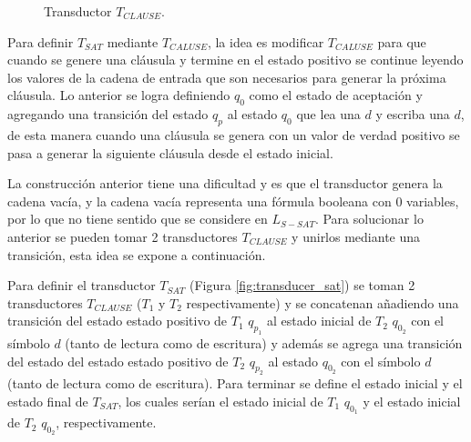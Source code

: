\documentclass[12pt]{article}
\begin{document}
\begin{figure}[h]
    \centering  \begin{otherlanguage}{english}
    \end{otherlanguage}
    \caption{Transductor $T_{CLAUSE}$.}
    \label{fig:transducer_clause} %
\end{figure}

Para definir $T_{SAT}$ mediante $T_{CALUSE}$, la idea es modificar $T_{CALUSE}$ para que cuando se genere 
una cláusula y termine en el estado positivo se continue leyendo los valores de la cadena de entrada que 
son necesarios para generar la próxima cláusula. Lo anterior se logra definiendo $q_0$ como el estado de 
aceptación y agregando una transición del estado $q_p$ al estado $q_0$ que lea una $d$ y escriba una $d$, 
de esta manera cuando una cláusula se genera con un valor de verdad positivo se pasa a generar la siguiente 
cláusula desde el estado inicial. 

La construcción anterior tiene una dificultad y es que el transductor genera la cadena vacía, y la cadena
vacía representa una fórmula booleana con 0 variables, por lo que no tiene sentido que se considere en $L_{S-SAT}$. Para 
solucionar lo anterior se pueden tomar 2 transductores $T_{CLAUSE}$ y unirlos mediante una transición, 
esta idea se expone a continuación.

Para definir el transductor $T_{SAT}$ (Figura \ref{fig:transducer_sat}) se toman 2 transductores 
$T_{CLAUSE}$ ($T_1$ y $T_2$ respectivamente) y se concatenan añadiendo una transición del estado 
estado positivo de $T_1$ $q_{p_1}$ al estado inicial de $T_2$ $q_{0_2}$ con el símbolo $d$
(tanto de lectura como de escritura) y además se agrega una transición del estado del estado 
estado positivo de $T_2$ $q_{p_2}$ al estado $q_{0_2}$ con el símbolo $d$ (tanto de lectura como de escritura).
Para terminar se define el estado inicial y el estado final de $T_{SAT}$, los cuales serían el estado inicial de $T_1$
$q_{0_1}$ y el estado inicial de $T_2$ $q_{0_2}$, respectivamente.
\end{document}
